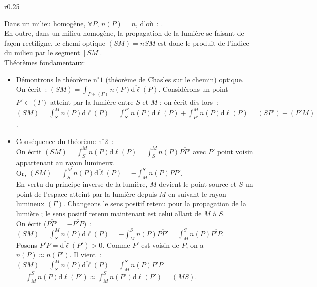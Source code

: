\documentclass{article}
\newcommand{\mathcolorbox}[2]{\fcolorbox{black}{#1}{$#2$}}
\begin{document}
\begin{wrapfigure}{r}{0.25\textwidth}
\caption{}\label{Fig.1}
\end{wrapfigure}


Dans un milieu homogène, $\forall P$, $n(P)=n$, d'où : \mathcolorbox{gray!20}{(SM)
= nSM}. \\
En outre, dans un milieu homogène, la propagation de la lumière se
faisant de façon rectiligne, le chemi optique $(SM) = nSM$ est donc
le produit de l'indice du milieu par le segment $\left[SM]$.
\\
\underline{Théorèmes fondamentaux:}
\begin{itemize}
\item Démontrons le théorème n$^{\circ}1$ (théorème de Chasles sur le
chemin) optique. \\
On écrit : $(SM) = \int_{P \in \left(\Gamma\right)}n(P)\overline{\mathrm{d}\ell}(P)$.
Considérons un point $P' \in \left(\Gamma\right)$ atteint par la lumière entre
$S$ et $M$ ; on écrit dès lors : $(SM) =\int_{S}^{M}
n(P)\overline{\mathrm{d}\ell}(P) = \int_{S}^{P'}
n(P)\overline{\mathrm{d}\ell}(P)+\int_{P'}^{M} n(P)\overline{\mathrm{d}\ell}(P) =
(SP')+(P'M)$.
\item \underline{Conséquence du théorème n$^{\circ}2$ :} \\
On écrit $(SM) = \int_{S}^{M} n(P)\overline{\mathrm{d}\ell}(P) = \int_{S}^{M}
n(P)\overline{PP'}$ avec $P'$
point voisin appartenant au rayon lumineux. \\
Or, $(SM) = \int_{S}^{M} n(P)\overline{\mathrm{d}\ell}(P) = -\int_{M}^{S}
n(P)\overline{PP'}$. \\
En vertu du principe inverse de la lumière, $M$ devient le point
source et $S$ un point de l'espace atteint par la lumière depuis $M$
en suivant le rayon lumineux $\left(\Gamma\right)$. Changeons le sens positif
retenu pour la propagation de la lumière ; le sens positif retenu
maintenant est celui allant de $M$ à $S$. \\
On écrit ($\overline{PP'} = -\overline{P'P}$) : $(SM) = \int_{S}^{M}
n(P)\overline{\mathrm{d}\ell}(P) = -\int_{M}^{S} n(P)\overline{PP'} =
\int_{M}^{S}
n(P)\overline{P'P}$. \\
Posons $\overline{P'P} = \overline{\mathrm{d}\ell}(P') >0$. Comme $P'$ est
voisin de $P$, on a $n(P) \approx n(P')$. Il vient :
\\
$(SM) = \int_{S}^{M} n(P)\overline{\mathrm{d}\ell}(P) = \int_{M}^{S}
n(P)\overline{P'P}$ \\ $= \int_{M}^{S}
n(P)\overline{\mathrm{d}\ell}(P')\approx \int_{M}^{S}
n(P')\overline{\mathrm{d}\ell}(P')=(MS)$.
\end{itemize}
\end{document}

